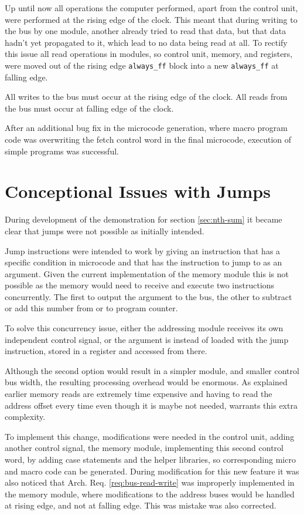 Up until now all operations the computer performed, apart from the control unit, were performed at the rising edge of the clock. This meant that during writing to the bus by one module, another already tried to read that data, but that data hadn't yet propagated to it, which lead to no data being read at all. To rectify this issue all read operations in modules, so control unit, memory, and registers, were moved out of the rising edge \texttt{always\_ff} block into a new \texttt{always\_ff} at falling edge.

\begin{arch-requirement} \label{req:bus-read-write}
  All writes to the bus must occur at the rising edge of the clock. All reads from the bus must occur at falling edge of the clock.
\end{arch-requirement}

After an additional bug fix in the microcode generation, where macro program code was overwriting the fetch control word in the final microcode, execution of simple programs was successful.


\section{Conceptional Issues with Jumps}
During development of the demonstration for section \ref{sec:nth-sum} it became clear that jumps were not possible as initially intended. 

Jump instructions were intended to work by giving an instruction that has a specific condition in microcode and that has the instruction to jump to as an argument. Given the current implementation of the memory module this is not possible as the memory would need to receive and execute two instructions concurrently. The first to output the argument to the bus, the other to subtract or add this number from or to program counter. 

To solve this concurrency issue, either the addressing module receives its own independent control signal, or the argument is instead of loaded with the jump instruction, stored in a register and accessed from there. 

Although the second option would result in a simpler module, and smaller control bus width, the resulting processing overhead would be enormous. As explained earlier memory reads are extremely time expensive and having to read the address offset every time even though it is maybe not needed, warrants this extra complexity.

To implement this change, modifications were needed in the control unit, adding another control signal, the memory module, implementing this second control word, by adding case statements and the helper libraries, so corresponding micro and macro code can be generated. During modification for this new feature it was also noticed that Arch. Req. \ref{req:bus-read-write} was improperly implemented in the memory module, where modifications to the address buses would be handled at rising edge, and not at falling edge. This was mistake was also corrected.

